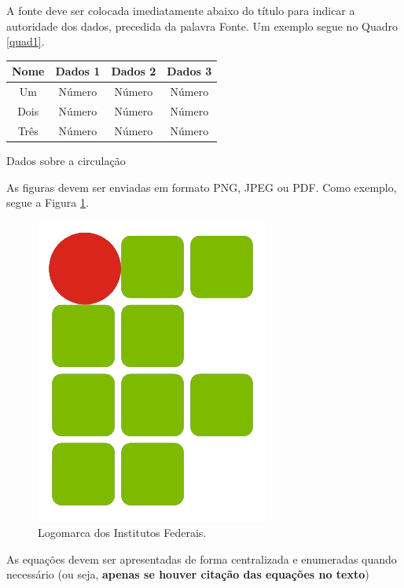 \documentclass{sep}
\begin{document}
A fonte deve ser colocada imediatamente abaixo do título para indicar a autoridade dos dados, precedida da palavra Fonte.
Um exemplo segue no Quadro \ref{quad1}.

\begin{quadro}[!htb] \centering
  \begin{tabular}{|c|c|c|c|} \hline
  \textbf{Nome} & \textbf{Dados 1} & \textbf{Dados 2} & \textbf{Dados 3} \\ \hline
  Um   & Número & Número & Número \\ \hline
  Dois & Número & Número & Número \\ \hline
  Três & Número & Número & Número \\ \hline
  \end{tabular}
\caption{Dados sobre a circulação} \label{quad1}
\vspace{-11pt}
\end{quadro}

As figuras devem ser enviadas em formato PNG, JPEG ou PDF.
Como exemplo, segue a Figura \ref{fig1}.

\begin{figure}[!htb] \centering
\includegraphics{if}
\caption{Logomarca dos Institutos Federais.} \label{fig1}
\vspace{-11pt}
%
\end{figure}

As equações devem ser apresentadas de forma centralizada e enumeradas quando necessário (ou seja, \textbf{apenas se houver citação das equações no texto})
\end{document}
